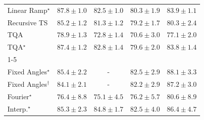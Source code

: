\begin{tabular}{l|cccc|}
Linear Ramp$^\star$ & {\cellcolor[HTML]{00472A}} \color[HTML]{F1F1F1} $87.8\pm 1.0$ & {\cellcolor[HTML]{096F3A}} \color[HTML]{F1F1F1} $82.5\pm 1.0$ & {\cellcolor[HTML]{1A7D40}} \color[HTML]{F1F1F1} $80.3\pm 1.9$ & {\cellcolor[HTML]{006636}} \color[HTML]{F1F1F1} $83.9\pm 1.1$ \\
Recursive TS & {\cellcolor[HTML]{005B32}} \color[HTML]{F1F1F1} $85.2\pm 1.2$ & {\cellcolor[HTML]{12763D}} \color[HTML]{F1F1F1} $81.3\pm 1.2$ & {\cellcolor[HTML]{228343}} \color[HTML]{F1F1F1} $79.2\pm 1.7$ & {\cellcolor[HTML]{1A7D40}} \color[HTML]{F1F1F1} $80.3\pm 2.4$ \\
TQA & {\cellcolor[HTML]{258745}} \color[HTML]{F1F1F1} $78.9\pm 1.3$ & {\cellcolor[HTML]{5AB76A}} \color[HTML]{F1F1F1} $72.8\pm 1.4$ & {\cellcolor[HTML]{74C477}} \color[HTML]{000000} $70.6\pm 3.0$ & {\cellcolor[HTML]{31974F}} \color[HTML]{F1F1F1} $77.1\pm 2.0$ \\
TQA$^\star$ & {\cellcolor[HTML]{004A2B}} \color[HTML]{F1F1F1} $87.4\pm 1.2$ & {\cellcolor[HTML]{076D39}} \color[HTML]{F1F1F1} $82.8\pm 1.4$ & {\cellcolor[HTML]{208242}} \color[HTML]{F1F1F1} $79.6\pm 2.0$ & {\cellcolor[HTML]{006636}} \color[HTML]{F1F1F1} $83.8\pm 1.4$ \\
\cline{1-5}
\multicolumn{5}{c}{\rule{0pt}{8pt}SV} \\
\midrule
Fixed Angles$^\star$ & {\cellcolor[HTML]{034C78}} \color[HTML]{F1F1F1} $85.4\pm 2.2$ & {\cellcolor[HTML]{000000}} \color[HTML]{F1F1F1} {\cellcolor{white}} \color{black} - & {\cellcolor[HTML]{046096}} \color[HTML]{F1F1F1} $82.5\pm 2.9$ & {\cellcolor[HTML]{023858}} \color[HTML]{F1F1F1} $88.1\pm 3.3$ \\
Fixed Angles$^\dagger$ & {\cellcolor[HTML]{045687}} \color[HTML]{F1F1F1} $84.1\pm 2.1$ & {\cellcolor[HTML]{000000}} \color[HTML]{F1F1F1} {\cellcolor{white}} \color{black} - & {\cellcolor[HTML]{046198}} \color[HTML]{F1F1F1} $82.2\pm 2.9$ & {\cellcolor[HTML]{023E62}} \color[HTML]{F1F1F1} $87.2\pm 3.0$ \\
Fourier$^\star$ & {\cellcolor[HTML]{2484BA}} \color[HTML]{F1F1F1} $76.4\pm 8.8$ & {\cellcolor[HTML]{328DBF}} \color[HTML]{F1F1F1} $75.1\pm 4.5$ & {\cellcolor[HTML]{2685BB}} \color[HTML]{F1F1F1} $76.2\pm 5.7$ & {\cellcolor[HTML]{0569A4}} \color[HTML]{F1F1F1} $80.6\pm 8.9$ \\
Interp.$^\star$ & {\cellcolor[HTML]{034D79}} \color[HTML]{F1F1F1} $85.3\pm 2.3$ & {\cellcolor[HTML]{03517E}} \color[HTML]{F1F1F1} $84.8\pm 1.7$ & {\cellcolor[HTML]{046096}} \color[HTML]{F1F1F1} $82.5\pm 4.0$ & {\cellcolor[HTML]{03456C}} \color[HTML]{F1F1F1} $86.4\pm 4.7$ \\

\end{tabular}
